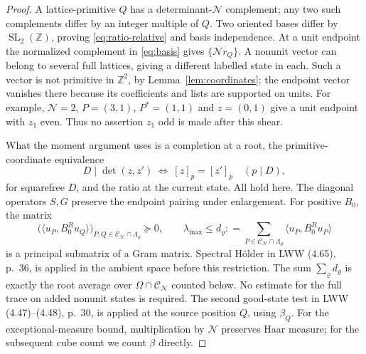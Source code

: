 \documentclass[11pt]{article}
\theoremstyle{definition}
\newcommand{\Z}{\mathbb Z}
\newcommand{\GN}{\mathcal N}
\newcommand{\CC}{\mathcal C}
\theoremstyle{remark}
\numberwithin{equation}{section}
\begin{document}
\begin{proof}
A lattice-primitive $Q$ has a determinant-$\GN$ complement; any two
such complements differ by an integer multiple of $Q$.
Two oriented bases differ by $\operatorname{SL}_2(\Z)$, proving
\eqref{eq:ratio-relative} and basis independence.
At a unit endpoint the normalized complement in \eqref{eq:basis}
gives $\{\GN r_Q\}$. A nonunit vector can belong to several full
lattices, giving a different labelled state in each. Such a vector
is not primitive in $\Z^2$, by Lemma~\ref{lem:coordinates}; the
endpoint vector vanishes there because its coefficients and lists
are supported on units. For example, $\GN=2$, $P=(3,1)$,
$P^*=(1,1)$ and $z=(0,1)$ give a unit endpoint with $z_1$ even.
Thus no assertion $z_1$ odd is made after this shear.

What the moment argument uses is a completion at a root, the
primitive-coordinate equivalence
\[
 D\mid\det(z,z')\ \Longleftrightarrow\ [z]_p=[z']_p
 \quad(p\mid D),
\]
for squarefree $D$, and the ratio at the current state.
All hold here. The diagonal operators $S,G$ preserve the endpoint
pairing under enlargement. For positive $B_0$, the matrix
\begin{equation}\label{eq:compressed-gram}
 \bigl(\langle u_P,B_0^R u_Q\rangle\bigr)
       _{P,Q\in\CC_{\GN}\cap\Lambda_\varrho}
 \succeq0,\qquad
 \lambda_{\max}\le d_\varrho:
 =\sum_{P\in\CC_{\GN}\cap\Lambda_\varrho}
        \langle u_P,B_0^R u_P\rangle
\end{equation}
is a principal submatrix of a Gram matrix.
Spectral H\"older in LWW (4.65), p.~36, is applied in the ambient
space before this restriction. The sum $\sum_\varrho d_\varrho$
is exactly the root average over $\Omega\cap\CC_{\GN}$ counted below.
No estimate for the full trace on added nonunit states is required.
The second good-state test in LWW (4.47)--(4.48), p.~30, is applied
at the source position $Q$, using $\beta_Q$.
For the exceptional-measure bound, multiplication by $\GN$ preserves
Haar measure; for the subsequent cube count we count $\beta$ directly.
\end{proof}
\end{document}
